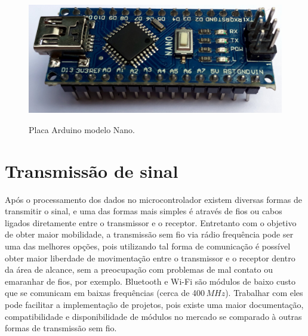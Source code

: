 \documentclass[
	12pt,				%
	openright,			%
	oneside,			%
	a4paper,			%
	english,			%
	brazil				%
	]{abntex2}
\begin{document}
		\begin{figure}[h!]
			\centering
			\caption{Placa Arduino modelo Nano.}
  		\includegraphics[width=12cm]{./figures/arduino-nano1.jpg}
  		\label{Fig:arduino-nano1}
		\end{figure}



	


		\section{Transmissão de sinal}
		
		Após o processamento dos dados no microcontrolador existem diversas formas de transmitir o sinal, e uma das formas mais simples é através de fios ou cabos ligados diretamente entre o transmissor e o receptor. Entretanto com o objetivo de obter maior mobilidade, a transmissão sem fio via rádio frequência pode ser uma das melhores opções, pois utilizando tal forma de comunicação é possível obter maior liberdade de movimentação entre o transmissor e o receptor dentro da área de alcance, sem a preocupação com problemas de mal contato ou emaranhar de fios, por exemplo. Bluetooth e Wi-Fi são módulos de baixo custo que se comunicam em baixas frequências (cerca de 400$\,MHz$). Trabalhar com eles pode facilitar a implementação de projetos, pois existe uma maior documentação, compatibilidade e disponibilidade de módulos no mercado se comparado à outras formas de transmissão sem fio.
		
\end{document}
